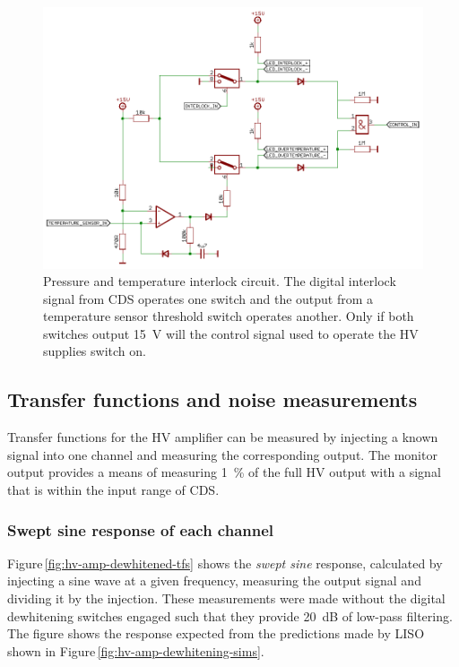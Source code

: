 \begin{figure}
  \centering
  \includegraphics[width=\columnwidth]{graphics/60-hv-amp-interlock.pdf}
  \caption[High voltage amplifier interlock schematic]{\label{fig:hv-amp-interlock}Pressure and temperature interlock circuit. The digital interlock signal from \gls{CDS} operates one switch and the output from a temperature sensor threshold switch operates another. Only if both switches output \SI{15}{\volt} will the control signal used to operate the \gls{HV} supplies switch on.}
\end{figure}

\subsection{Transfer functions and noise measurements}
Transfer functions for the \gls{HV} amplifier can be measured by injecting a known signal into one channel and measuring the corresponding output. The monitor output provides a means of measuring \SI{1}{\percent} of the full \gls{HV} output with a signal that is within the input range of \gls{CDS}.

\subsubsection{Swept sine response of each channel}
Figure\,\ref{fig:hv-amp-dewhitened-tfs} shows the \emph{swept sine} response, calculated by injecting a sine wave at a given frequency, measuring the output signal and dividing it by the injection. These measurements were made without the digital dewhitening switches engaged such that they provide \SI{20}{\deci\bel} of low-pass filtering. The figure shows the response expected from the predictions made by \gls{LISO} shown in Figure\,\ref{fig:hv-amp-dewhitening-sims}.

